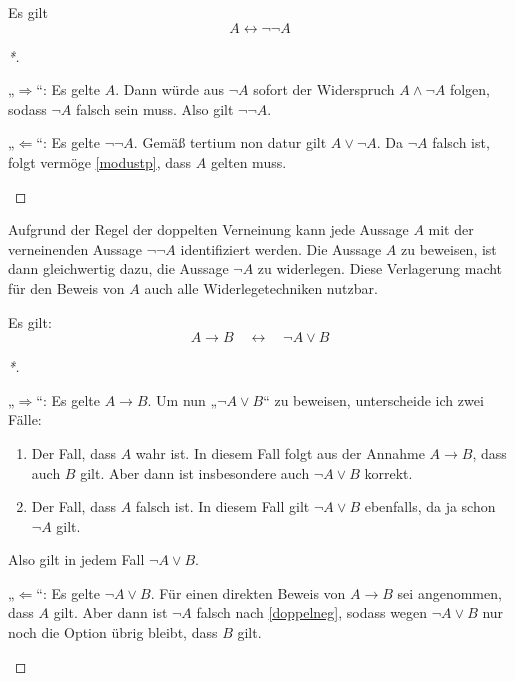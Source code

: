    
\begin{satz} \label{doppelneg}
    Es gilt
    \[ A\leftrightarrow \neg \neg A \]
\end{satz}
\begin{proof}[*]
    \begin{labeling}
        \item[„$\Rightarrow$“:] Es gelte $A$. Dann würde aus $\neg A$ sofort der Widerspruch $A\land \neg A$ folgen, sodass $\neg A$ falsch sein muss. Also gilt $\neg\neg A$.
        \item[„$\Leftarrow$“:] Es gelte $\neg \neg A$. Gemäß tertium non datur gilt $A\lor \neg A$. Da $\neg A$ falsch ist, folgt vermöge \cref{modustp}, dass $A$ gelten muss. \qedhere
    \end{labeling}
\end{proof}


\begin{bem}
    Aufgrund der Regel der doppelten Verneinung kann jede Aussage $A$ mit der verneinenden Aussage $\neg\neg A$ identifiziert werden. Die Aussage $A$ zu beweisen, ist dann gleichwertig dazu, die Aussage $\neg A$ zu widerlegen. Diese Verlagerung macht für den Beweis von $A$ auch alle Widerlegetechniken nutzbar.
\end{bem}


\begin{satz} \label{implikationchar}
    Es gilt:
        \[ A\to B\quad \leftrightarrow\quad \neg A\lor B \]
\end{satz}
\begin{proof}[*]
    \begin{labeling}
        \item[„$\Rightarrow$“:] Es gelte $A\to B$. Um nun „$\neg A\lor B$“ zu beweisen, unterscheide ich zwei Fälle:
        \begin{enumerate}[1)]
            \item Der Fall, dass $A$ wahr ist. In diesem Fall folgt aus der Annahme $A\to B$, dass auch $B$ gilt. Aber dann ist insbesondere auch $\neg A\lor B$ korrekt.
            \item Der Fall, dass $A$ falsch ist. In diesem Fall gilt $\neg A\lor B$ ebenfalls, da ja schon $\neg A$ gilt.
        \end{enumerate}
        Also gilt in jedem Fall $\neg A\lor B$.
        \item[„$\Leftarrow$“:] Es gelte $\neg A\lor B$. Für einen direkten Beweis von $A\to B$ sei angenommen, dass $A$ gilt. Aber dann ist $\neg A$ falsch nach \cref{doppelneg}, sodass wegen $\neg A\lor B$ nur noch die Option übrig bleibt, dass $B$ gilt. \qedhere
    \end{labeling}
\end{proof}


